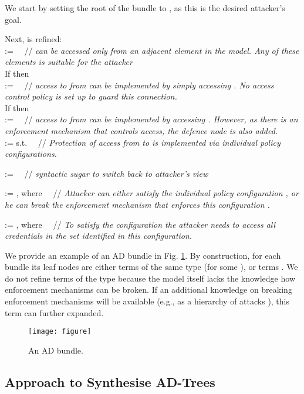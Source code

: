 \documentclass{llncs}
\begin{document}
We start by setting the root of the bundle to \taccess, as this is the desired attacker's goal. 

Next, \taccess is refined:\\
\taccess := \OR  \ \ // \emph{ can be accessed only from an adjacent element in the model. Any of these elements is suitable for the attacker}\\

If  then\\
 \taccfrom :=  \ \ // \emph{access to  from  can be implemented by simply accessing . No access control policy is set up to guard this connection.}\\


If  then\\
\taccfrom :=   \ \ // \emph{access to  from  can be implemented by accessing . However, as there is an enforcement mechanism that controls access, the defence node is also added.}\\

\tdefence :=  s.t.  \ \ // \emph{Protection of access from  to  is implemented via individual policy configurations.}


\tdefpolicy :=  \ \ // \emph{syntactic sugar to switch back to attacker's view} 

\tbreakpol := , where  \ \ // \emph{Attacker can either satisfy the individual policy configuration , or he can break the enforcement mechanism  that enforces this configuration . }

\tsatpol := , where  \ \ // \emph{To satisfy the configuration the attacker needs to access all credentials in the set  identified in this configuration}.

We provide an example of an AD bundle in Fig. \ref{fig:bundle}.
By construction, for each bundle  its leaf nodes are either terms of the same type (\taccess for some ), or terms . We do not refine terms of the type \tbreak because the model itself lacks the knowledge how enforcement mechanisms can be broken. If an additional knowledge on breaking enforcement mechanisms will be available (e.g., as a hierarchy of attacks \cite{Pinchinat-WFMDS-2014}), this term can further expanded. 

\begin{figure}[htb]
\centering
\texttt{[image: figure]}
\caption{An AD bundle.}
\label{fig:bundle}
\end{figure}

\subsection{Approach to Synthesise AD-Trees}
\end{document}
